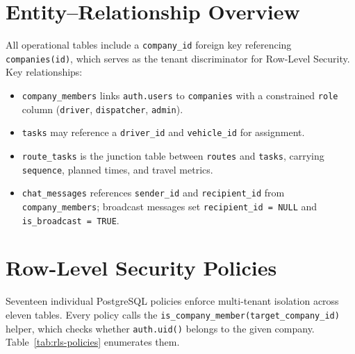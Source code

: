 \section{Entity--Relationship Overview}

All operational tables include a \texttt{company\_id} foreign key referencing
\texttt{companies(id)}, which serves as the tenant discriminator for Row-Level
Security.  Key relationships:

\begin{itemize}
  \item \texttt{company\_members} links \texttt{auth.users} to \texttt{companies}
        with a constrained \texttt{role} column (\texttt{driver}, \texttt{dispatcher},
        \texttt{admin}).
  \item \texttt{tasks} may reference a \texttt{driver\_id} and \texttt{vehicle\_id}
        for assignment.
  \item \texttt{route\_tasks} is the junction table between \texttt{routes} and
        \texttt{tasks}, carrying \texttt{sequence}, planned times, and travel metrics.
  \item \texttt{chat\_messages} references \texttt{sender\_id} and
        \texttt{recipient\_id} from \texttt{company\_members}; broadcast messages
        set \texttt{recipient\_id = NULL} and \texttt{is\_broadcast = TRUE}.
\end{itemize}

\section{Row-Level Security Policies}

Seventeen individual PostgreSQL policies enforce multi-tenant isolation across
eleven tables.  Every policy calls the
\texttt{is\_company\_member(target\_company\_id)} helper, which checks whether
\texttt{auth.uid()} belongs to the given company.
Table~\ref{tab:rls-policies} enumerates them.

